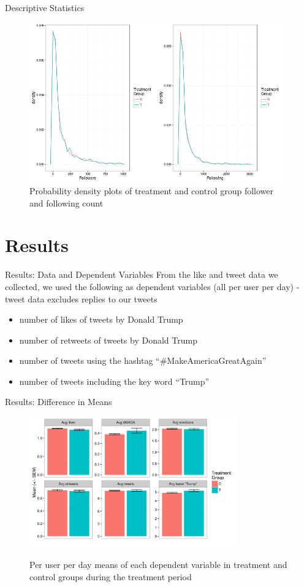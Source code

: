 \documentclass[10pt]{beamer}\usepackage[]{graphicx}\usepackage[]{color}
\begin{document}
\begin{frame}{Descriptive Statistics}

\begin{figure}
\includegraphics[width=11cm]{../plots/hists.png}
\caption{Probability density plots of treatment and control group follower and following count}
\end{figure}

\end{frame}


\section{Results}
\begin{frame}{Results: Data and Dependent Variables}
From the like and tweet data we collected, we used the following as dependent variables (all per user per day) - tweet data excludes replies to our tweets

\begin{itemize}
\item number of likes of tweets by Donald Trump
\item number of retweets of tweets by Donald Trump
\item number of tweets using the hashtag ``\#MakeAmericaGreatAgain''
\item number of tweets including the key word ``Trump''
\end{itemize} 
\end{frame}


\begin{frame}{Results: Difference in Means}

\begin{figure}
\includegraphics[width=9cm]{../plots/mean_bars.png}
\label{fig:mean_bars}
\caption{Per user per day means of each dependent variable in treatment and control groups during the treatment period}
\end{figure}

\end{frame}
\end{document}
